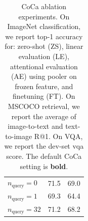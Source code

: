 \begin{table}[t]
{\begin{minipage}{0.29\linewidth}
{\begin{center}
\begin{tabular}{lcc}
    $n_{\text{query}}=0$ & 71.5 & 69.0 \\
    $n_{\text{query}}=1$ & 69.3 & 64.4 \\
    $n_{\text{query}}=32$ & 71.2 & 68.2 \\
    \bottomrule
\end{tabular}
\end{center}}\end{minipage}
}
\vspace{-.1em}
\caption{CoCa ablation experiments. On ImageNet classification, we report top-1 accuracy for: zero-shot (ZS), linear evaluation (LE), attentional evaluation (AE) using pooler on frozen feature, and finetuning (FT). On MSCOCO retrieval, we report the average of image-to-text and text-to-image R@1. On VQA, we report the dev-set vqa score. The default CoCa setting is \textbf{bold}.}
\label{tab:ablations} \vspace{-.5em}
\end{table}
